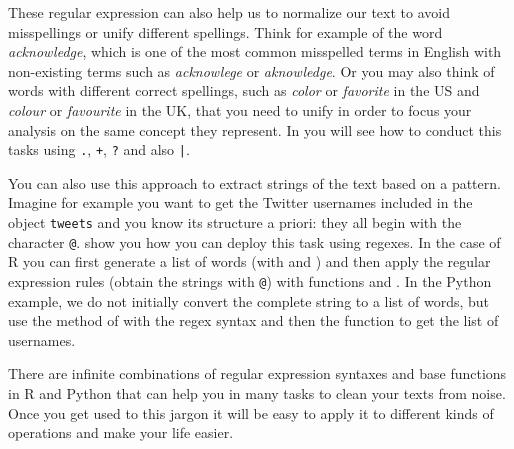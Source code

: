 
These regular expression can also help us to normalize our text to avoid misspellings or unify different spellings. Think for example of the word \emph{acknowledge}, which is one of the most common misspelled terms in English with non-existing terms such as \emph{acknowlege} or \emph{aknowledge}. Or you may also think of words with different correct spellings, such as \emph{color} or \emph{favorite} in the US and \emph{colour} or \emph{favourite} in the UK, that you need to unify in order to focus your analysis on the same concept they represent. In  you will see how to conduct this tasks using \verb+.+, \verb|+|, \verb+?+ and also \verb+|+.


You can also use this approach to extract strings of the text based on a pattern. Imagine for example you want to get the Twitter usernames included in the object \texttt{tweets} and you know its structure a priori: they all begin with the character \texttt{@}.  show you how you can deploy this task using regexes. In the case of R you can first generate a list of words (with  and ) and then apply the regular expression rules (obtain the strings with \texttt{@}) with functions  and . In the Python example, we do not initially convert the complete string to a list of words, but use the  method of  with the regex syntax and then the function  to get the list of usernames.


There are infinite combinations of regular expression syntaxes and base functions in R and Python that can help you in many tasks to clean your texts from noise. Once you get used to this jargon it will be easy to apply it to different kinds of operations and make your life easier.